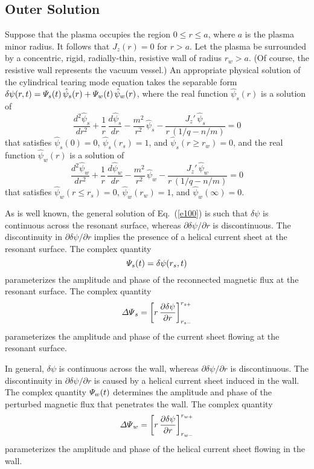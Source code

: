 \documentclass[12pt,prb,aps]{revtex4-1}
\begin{document}
\subsection{Outer Solution}\label{perfect}
Suppose that the plasma occupies the region $0\leq r\leq a$, where $a$ is the plasma  minor radius. It follows that
$J_z(r)=0$ for $r>a$. Let the plasma be surrounded by a concentric, rigid, radially-thin, resistive wall of radius $r_w>a$.  (Of course, the resistive wall represents the vacuum vessel.) 
 An appropriate
physical solution of the cylindrical tearing mode equation takes the separable form
$\delta\psi(r,t) = {\mit\Psi}_s(t)\,\hat{\psi}_s(r) + {\mit\Psi}_w(t)\,\hat{\psi}_w(r)$,
where the real function $\hat{\psi}_s(r)$ is a solution of 
\begin{equation}\label{e100}
\frac{d^2\hat{\psi}_s}{dr^2} + \frac{1}{r}\,\frac{d\hat{\psi}_s}{dr}-\frac{m^2}{r^2}\,\hat{\psi}_s - \frac{J_z'\,\hat{\psi}_s}{r\,(1/q-n/m)}= 0
\end{equation}
that satisfies
$\hat{\psi}_s(0) = 0$, 
$\hat{\psi}_s(r_s) = 1$, and
$\hat{\psi}_s(r\geq r_w) = 0$, and the real function  $\hat{\psi}_w(r)$ is a solution of 
\begin{equation}\label{e100a}
\frac{d^2\hat{\psi}_w}{dr^2} + \frac{1}{r}\,\frac{d\hat{\psi}_w}{dr}-\frac{m^2}{r^2}\,\hat{\psi}_w - \frac{J_z'\,\hat{\psi}_w}{r\,(1/q-n/m)}= 0
\end{equation}
that satisfies
$\hat{\psi}_w(r\leq r_s) = 0$,
$\hat{\psi}_w(r_w) = 1$,
and $\hat{\psi}_w(\infty) = 0$.

As is well known, the general solution of Eq.~(\ref{e100}) is such that $\delta\psi$ is continuous across the resonant surface,
whereas $\partial\delta\psi/\partial r$ is discontinuous. The discontinuity in $\partial \delta\psi/\partial r$ implies the presence of a helical  current sheet  at the resonant surface. 
The complex quantity 
\begin{equation}\label{e108}
{\mit\Psi}_s(t)= \delta\psi(r_s,t) 
\end{equation}
parameterizes the amplitude and phase of the
reconnected magnetic flux at the resonant surface.\cite{rf1993}
The complex quantity
\begin{equation}\label{e109}
{\mit\Delta\Psi}_s = \left[r\,\frac{\partial \delta\psi}{\partial r}\right]_{r_{s-}}^{r_{s+}}
\end{equation}
parameterizes the amplitude and phase of the current sheet flowing at the resonant surface. 

In general, $\delta\psi$ is continuous across the wall, whereas $\partial\delta\psi/\partial r$ is discontinuous. The discontinuity in $\partial\delta\psi/\partial r$ is caused by a helical current sheet induced in the wall. The complex quantity ${\mit\Psi}_w(t)$ determines the amplitude and
phase of the perturbed magnetic flux that penetrates the wall. The complex quantity
\begin{equation}\label{e118}
{\mit\Delta\Psi}_w = \left[r\,\frac{\partial\delta\psi}{\partial r}\right]_{r_{w-}}^{r_{w+}}
\end{equation}
parameterizes the amplitude and phase of the helical current sheet flowing in the wall.
\end{document}
